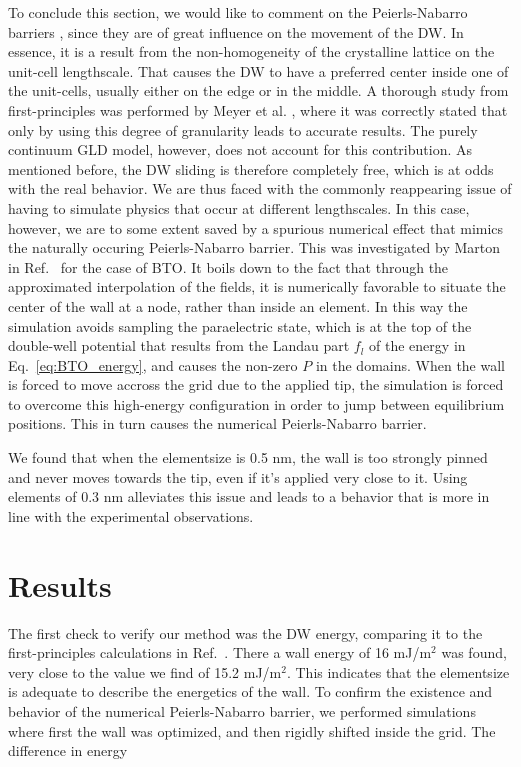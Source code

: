To conclude this section, we would like to comment on the Peierls-Nabarro barriers \cite{Peierls1940,Nabarro1947}, since they are of great influence on the movement of the DW.
In essence, it is a result from the non-homogeneity of the crystalline lattice on the unit-cell lengthscale.
That causes the DW to have a preferred center inside one of the unit-cells, usually either on the edge or in the middle.
A thorough study from first-principles was performed by Meyer et al. \cite{Meyer2002}, where it was correctly stated that only by using this degree of granularity leads to accurate results.
The purely continuum GLD model, however, does not account for this contribution.
As mentioned before, the DW sliding is therefore completely free, which is at odds with the real behavior.
We are thus faced with the commonly reappearing issue of having to simulate physics that occur at different lengthscales.
In this case, however, we are to some extent saved by a spurious numerical effect that mimics the naturally occuring Peierls-Nabarro barrier.
This was investigated by Marton in Ref.~\cite{Marton2018} for the case of BTO.
It boils down to the fact that through the approximated interpolation of the fields, it is numerically favorable to situate the center of the wall at a node, rather than inside an element.
In this way the simulation avoids sampling the paraelectric state, which is at the top of the double-well potential that results from the Landau part $f_l$ of the energy in Eq.~\ref{eq:BTO_energy}, and causes the non-zero $P$ in the domains.
When the wall is forced to move accross the grid due to the applied tip, the simulation is forced to overcome this high-energy configuration in order to jump between equilibrium positions.
This in turn causes the numerical Peierls-Nabarro barrier.

We found that when the elementsize is 0.5 nm, the wall is too strongly pinned and never moves towards the tip, even if it's applied very close to it.
Using elements of 0.3 nm alleviates this issue and leads to a behavior that is more in line with the experimental observations.
\section{Results}

The first check to verify our method was the DW energy, comparing it to the first-principles calculations in Ref.~\cite{Padilla1996}.
There a wall energy of 16 mJ/m$^2$ was found, very close to the value we find of 15.2 mJ/m$^2$.
This indicates that the elementsize is adequate to describe the energetics of the wall.
To confirm the existence and behavior of the numerical Peierls-Nabarro barrier, we performed simulations where first the wall was optimized, and then rigidly shifted inside the grid.
The difference in energy

